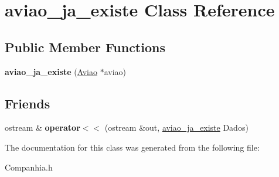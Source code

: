 \hypertarget{classaviao__ja__existe}{
\section{aviao\_\-ja\_\-existe Class Reference}
\label{classaviao__ja__existe}
}
\subsection*{Public Member Functions}
\begin{DoxyCompactItemize}
\item 
\hypertarget{classaviao__ja__existe_a1da1fd3726ef650c133588db77bfdb3e}{
{\bfseries aviao\_\-ja\_\-existe} (\hyperlink{class_aviao}{Aviao} $\ast$aviao)}
\label{classaviao__ja__existe_a1da1fd3726ef650c133588db77bfdb3e}

\end{DoxyCompactItemize}
\subsection*{Friends}
\begin{DoxyCompactItemize}
\item 
\hypertarget{classaviao__ja__existe_aa0e390561a70cf6c4b335af1ea886063}{
ostream \& {\bfseries operator$<$$<$} (ostream \&out, \hyperlink{classaviao__ja__existe}{aviao\_\-ja\_\-existe} Dados)}
\label{classaviao__ja__existe_aa0e390561a70cf6c4b335af1ea886063}

\end{DoxyCompactItemize}


The documentation for this class was generated from the following file:\begin{DoxyCompactItemize}
\item 
Companhia.h\end{DoxyCompactItemize}
